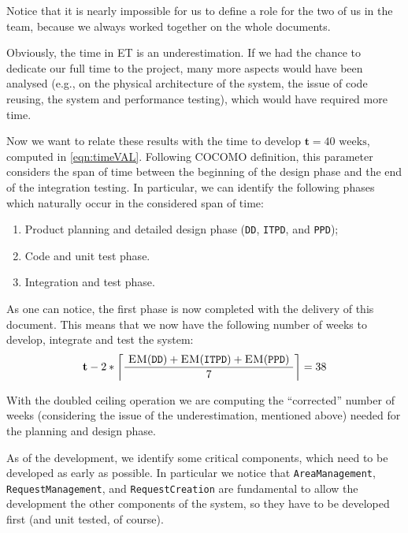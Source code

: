 Notice that it is nearly impossible for us to define a role for the two of us in the team, because we always worked together on the whole documents. 

Obviously, the time in \textsc{ET} is an underestimation. If we had the chance to dedicate our full time to the project, many more aspects would have been analysed (e.g., on the physical architecture of the system, the issue of code reusing, the system and performance testing), which would have required more time. 

Now we want to relate these results with the time to develop $ \mathbf{t} = 40 \text{ weeks} $, computed in \cref{eqn:timeVAL}. Following COCOMO definition, this parameter considers the span of time between the beginning of the design phase and the end of the integration testing. In particular, we can identify the following phases which naturally occur in the considered span of time: \begin{enumerate}
	
	\item Product planning and detailed design phase (\texttt{DD}, \texttt{ITPD}, and \texttt{PPD});
	
	\item Code and unit test phase. 
	
	\item Integration and test phase. 
	
\end{enumerate}

As one can notice, the first phase is now completed with the delivery of this document. This means that we now have the following number of weeks to develop, integrate and test the system:\begin{equation}
%
\mathbf{t} - 2 * \left\lceil \frac{ \text{ \textsc{EM}(\texttt{DD})} +  
									\text{\textsc{EM}(\texttt{ITPD})} +
									\text{\textsc{EM}(\texttt{PPD}) }
								   }{7} \right\rceil = 38
%	
\end{equation}

With the doubled ceiling operation we are computing the ``corrected'' number of weeks (considering the issue of the underestimation, mentioned above) needed for the planning and design phase.

As of the development, we identify some critical components, which need to be developed as early as possible. In particular we notice that \texttt{Area\-Man\-age\-ment}, \texttt{Re\-quest\-Man\-age\-ment}, and \texttt{Re\-quest\-Cre\-ation} are fundamental to allow the development the other components of the system, so they have to be developed first (and unit tested, of course). 

